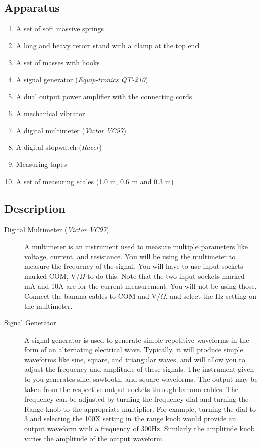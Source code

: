 \begin{refsection}
\subsection*{Apparatus}

\begin{enumerate}[label=\arabic*)]
\itemsep0em
\item A set of soft massive springs
\item A long and heavy retort stand with a clamp at the top end 
\item A set of masses with hooks
\item A signal generator (\textit{Equip-tronics QT-210})
\item A dual output power amplifier with the connecting cords
\item A mechanical vibrator
\item A digital multimeter (\textit{Victor VC97})
\item A digital stopwatch (\textit{Racer})
\item Measuring tapes
\item A set of measuring scales (1.0 m, 0.6 m and 0.3 m)
\end{enumerate}

\subsection*{Description}

\begin{description}

\item[Digital Multimeter (\textit{Victor VC97})]

A multimeter is an instrument used to measure multiple parameters like voltage, current, and resistance. You will be using the multimeter to measure the frequency of the signal. You will have to use input sockets marked COM, V/$\Omega$ to do this. Note that the two input sockets marked mA and 10A are for the current measurement. You will not be using those. Connect the banana cables to COM and V/$\Omega$, and select the Hz setting on the multimeter. 

\item[Signal Generator]

A signal generator is used to generate simple repetitive waveforms in the form of an alternating electrical wave. Typically, it will produce simple waveforms like sine, square, and triangular waves, and will allow you to adjust the frequency and amplitude of these signals. The instrument given to you generates sine, sawtooth, and square waveforms. The output may be taken from the respective output sockets through banana cables. The frequency can be adjusted by turning the frequency dial and turning the Range knob to the appropriate multiplier. For example, turning the dial to 3 and selecting the 100X setting in the range knob would provide an output waveform with a frequency of 300Hz. Similarly the amplitude knob varies the amplitude of the output waveform.


\end{description}
\end{refsection}
